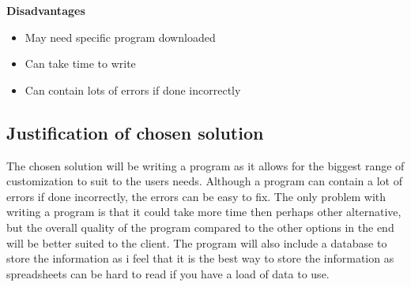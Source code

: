 \bf {Disadvantages}
\begin{itemize}
	\item May need specific program downloaded
	\item Can take time to write
	\item Can contain lots of errors if done incorrectly
\end{itemize}
\subsection{Justification of chosen solution}
The chosen solution will be writing a program as it allows for the biggest range of customization  to suit to the users needs. Although a program can contain a lot of errors if done incorrectly, the errors can be easy to fix. The only problem with writing a program is that it could take more time then perhaps other alternative, but the overall quality of the program compared to the other options in the end will be better suited to the client. The program will also include a database to store the information as i feel that it is the best way to store the information as spreadsheets  can be hard to read if you have a load of data to use.